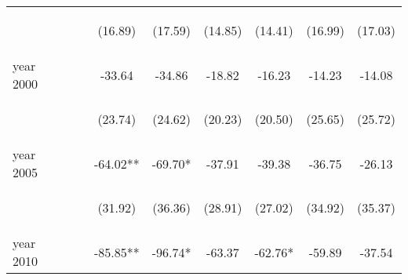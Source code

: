 \begin{landscape}
\begin{table}[htpb!]
\begin{center}
\begin{tabular}{lcccccccc}
&&&\begin{footnotesize}(16.89)\end{footnotesize}&\begin{footnotesize}(17.59)\end{footnotesize}&\begin{footnotesize}(14.85)\end{footnotesize}&\begin{footnotesize}(14.41)\end{footnotesize}&\begin{footnotesize}(16.99)\end{footnotesize}&\begin{footnotesize}(17.03)\end{footnotesize}\\
year 2000&&&-33.64&-34.86&-18.82&-16.23&-14.23&-14.08\\
&&&\begin{footnotesize}(23.74)\end{footnotesize}&\begin{footnotesize}(24.62)\end{footnotesize}&\begin{footnotesize}(20.23)\end{footnotesize}&\begin{footnotesize}(20.50)\end{footnotesize}&\begin{footnotesize}(25.65)\end{footnotesize}&\begin{footnotesize}(25.72)\end{footnotesize}\\
year 2005&&&-64.02**&-69.70*&-37.91&-39.38&-36.75&-26.13\\
&&&\begin{footnotesize}(31.92)\end{footnotesize}&\begin{footnotesize}(36.36)\end{footnotesize}&\begin{footnotesize}(28.91)\end{footnotesize}&\begin{footnotesize}(27.02)\end{footnotesize}&\begin{footnotesize}(34.92)\end{footnotesize}&\begin{footnotesize}(35.37)\end{footnotesize}\\
year 2010&&&-85.85**&-96.74*&-63.37&-62.76*&-59.89&-37.54\\

\end{tabular}
\end{center}
\end{table}
\end{landscape}
